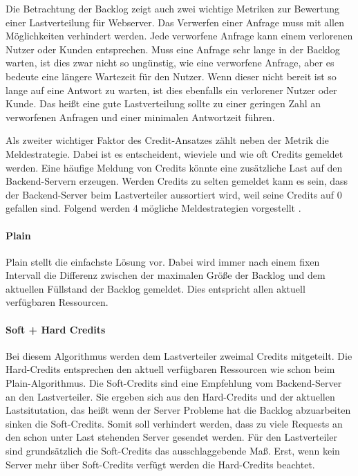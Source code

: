 \documentclass[a4paper, 12pt, BCOR10mm, DIV12, toc=bibliography, toc=listof, german]{scrbook}
\begin{document}
	Die Betrachtung der Backlog zeigt auch zwei wichtige Metriken zur Bewertung einer Lastverteilung
	für Webserver. Das Verwerfen einer Anfrage muss mit allen Möglichkeiten verhindert werden. Jede
	verworfene Anfrage kann einem verlorenen Nutzer oder Kunden entsprechen. Muss eine Anfrage sehr
	lange in der Backlog warten, ist dies zwar nicht so ungünstig, wie eine verworfene Anfrage, aber
	es bedeute eine längere Wartezeit für den Nutzer. Wenn dieser nicht bereit ist so lange auf eine
	Antwort zu warten, ist dies ebenfalls ein verlorener Nutzer oder Kunde. Das heißt eine gute
	Lastverteilung sollte zu einer geringen Zahl an verworfenen Anfragen und einer minimalen
	Antwortzeit führen.

	Als zweiter wichtiger Faktor des Credit-Ansatzes zählt neben der Metrik die Meldestrategie. Dabei
	ist es entscheident, wieviele und wie oft Credits gemeldet werden. Eine häufige Meldung von Credits
	könnte eine zusätzliche Last auf den Backend-Servern erzeugen. Werden Credits zu selten gemeldet
	kann es sein, dass der Backend-Server beim Lastverteiler aussortiert wird, weil seine Credits auf
	0 gefallen sind. Folgend werden 4 mögliche Meldestrategien vorgestellt \cite{scsczile2008,
	schneidenbach2009}.
	
	\paragraph{Plain} %
	\label{par:plain}

		Plain stellt die einfachste Lösung vor. Dabei wird immer nach einem fixen Intervall die
		Differenz zwischen der maximalen Größe der Backlog und dem aktuellen Füllstand der Backlog
		gemeldet. Dies entspricht allen aktuell verfügbaren Ressourcen.


	\paragraph{Soft + Hard Credits} %
	\label{par:soft-hard-credits}

	Bei diesem Algorithmus werden dem Lastverteiler zweimal Credits mitgeteilt. Die Hard-Credits
	entsprechen den aktuell verfügbaren Ressourcen wie schon beim Plain-Algorithmus. Die Soft-Credits
	sind eine Empfehlung vom Backend-Server an den Lastverteiler. Sie ergeben sich aus den
	Hard-Credits und der aktuellen Lastsitutation, das heißt wenn der Server Probleme hat die Backlog
	abzuarbeiten sinken die Soft-Credits. Somit soll verhindert werden, dass zu viele Requests an den
	schon unter Last stehenden Server gesendet werden. Für den Lastverteiler sind grundsätzlich die
	Soft-Credits das ausschlaggebende Maß. Erst, wenn kein Server mehr über Soft-Credits verfügt
	werden die Hard-Credits beachtet.
	
\end{document}
